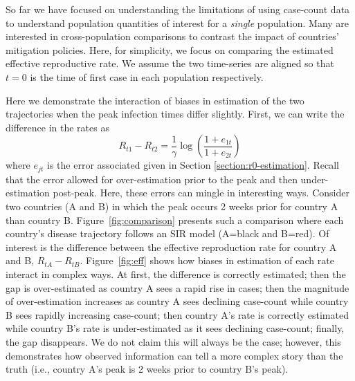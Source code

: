 \documentclass[11pt]{amsart}
\numberwithin{equation}{section}
\theoremstyle{plain}
\begin{document}
So far we have focused on understanding the limitations of using case-count data to understand population quantities of interest for a \emph{single} population.  Many are interested in cross-population comparisons to contrast the impact of countries' mitigation policies.  Here, for simplicity, we focus on comparing the estimated effective reproductive rate.  We assume the two time-series are aligned so that $t=0$ is the time of first case in each population respectively.

Here we demonstrate the interaction of biases in estimation of the two trajectories when the peak infection times differ slightly.  First, we can write the difference in the rates as
$$
R_{t1} - R_{t2} = \frac{1}{\gamma} \log \left( \frac{1 + e_{1t}}{1+e_{2t}} \right)
$$
where $e_{jt}$ is the error associated given in Section \ref{section:r0-estimation}.  Recall that the error allowed for over-estimation prior to the peak and then under-estimation post-peak.  Here, these errors can mingle in interesting ways.  Consider two countries (A and B) in which the peak occurs 2 weeks prior for country A than country B.  Figure~\ref{fig:comparison} presents such a comparison where each country's disease trajectory follows an SIR model (A=black and B=red). Of interest is the difference between the effective reproduction rate for country A and B, $R_{tA} - R_{tB}$. Figure~\ref{fig:eff} shows how biases in estimation of each rate interact in complex ways.  At first, the difference is correctly estimated; then the gap is over-estimated as country A sees a rapid rise in cases; then the magnitude of over-estimation increases as country A sees declining case-count while country B sees rapidly increasing case-count; then country A's rate is correctly estimated while country B's rate is under-estimated as it sees declining case-count; finally, the gap disappears.  We do not claim this will always be the case; however, this demonstrates how observed information can tell a more complex story than the truth (i.e., country A's peak is 2 weeks prior to country B's peak).
\end{document}
